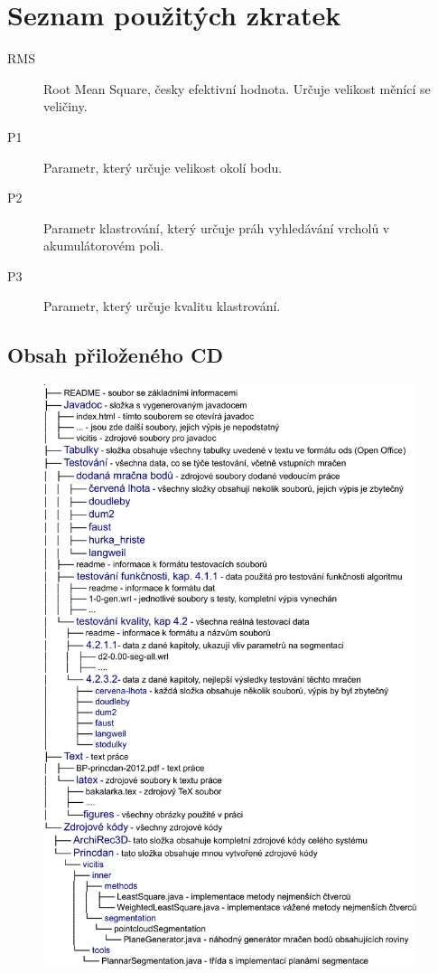 \documentclass[11pt,twoside,a4paper]{book}
\begin{document}
%

\appendix

\chapter{Seznam použitých zkratek}
\label{chap:zkratky}

\begin{description}
\item[RMS] Root Mean Square, česky efektivní hodnota. Určuje velikost měnící se veličiny.
\item[P1] Parametr, který určuje velikost okolí bodu.
\item[P2] Parametr klastrování, který určuje práh vyhledávání vrcholů v akumulátorovém poli.
\item[P3] Parametr, který určuje kvalitu klastrování.
\end{description}


\begin{changeheight}{3cm}
\chapter{Obsah přiloženého CD}
\label{chap:CD}
\begin{figure}[ht]
\includegraphics[height=17cm]{figures/CD}
\label{fig:CD}
\end{figure}
\end{changeheight}
\end{document}
